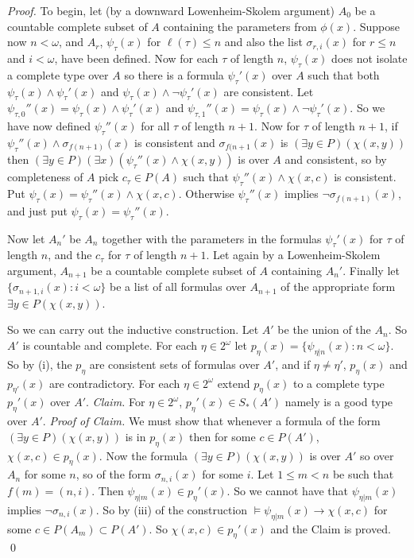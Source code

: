 \documentclass[12pt]{article}
\begin{document}
\begin{proof}
\vspace{2mm}
\noindent
To begin, let (by a downward Lowenheim-Skolem argument) $A_{0}$ be a countable complete subset of $A$ containing the parameters from $\phi(x)$. 
Suppose now $n< \omega$,  and $A_{r}$, $\psi_{\tau}(x)$ for $\ell(\tau) \leq n$ and also the list $\sigma_{r,i}(x)$ for $r\leq n$ and $i<\omega$, have been defined. 
Now for each $\tau$ of length $n$, $\psi_{\tau}(x)$ does not isolate a complete type over $A$ so there is a formula $\psi_{\tau}'(x)$ over $A$ such that both $\psi_{\tau}(x)\wedge \psi_{\tau}'(x)$ and $\psi_{\tau}(x)\wedge \neg\psi_{\tau}'(x)$ are consistent.   Let $\psi_{\tau ,0}''(x)  = \psi_{\tau}(x)\wedge \psi_{\tau}'(x)$ and $\psi_{\tau, 1}''(x) = \psi_{\tau}(x)\wedge \neg\psi_{\tau}'(x)$. 
So we have now defined $\psi_{\tau}''(x)$ for all $\tau$ of length $n+1$.  Now for $\tau$ of length $n+1$, if $\psi_{\tau}''(x)\wedge \sigma_{f(n+1)}(x)$ is consistent and $\sigma_{f(n+1}(x)$ is $(\exists y\in P)(\chi(x,y))$ then 
$(\exists y\in P)(\exists x)(\psi_{\tau}''(x) \wedge \chi(x,y))$ is over $A$ and consistent, so by completeness of $A$ pick $c_{\tau} \in P(A)$ such that $\psi_{\tau}''(x)\wedge \chi(x,c)$ is consistent.  Put $\psi_{\tau}(x) = \psi_{\tau}''(x)\wedge \chi(x,c)$.  Otherwise $\psi_{\tau}''(x)$ implies $\neg\sigma_{f(n+1)}(x)$, and just put $\psi_{\tau}(x) = \psi_{\tau}''(x)$. 

Now let $A_{n}'$ be $A_{n}$ together with the parameters in the formulas $\psi_{\tau}'(x)$ for $\tau$ of length $n$, and the $c_{\tau}$ for $\tau$ of length $n+1$. Let again by a  Lowenheim-Skolem argument, $A_{n+1}$ be a countable complete subset of $A$ containing $A_{n}'$.  Finally let  $\{\sigma_{n+1, i}(x): i<\omega\}$ be a list of all formulas over $A_{n+1}$ of the appropriate form $\exists y\in P(\chi(x,y))$.

\vspace{2mm}
\noindent
So we can carry out the inductive construction. Let $A'$ be the union of the $A_{n}$. So $A'$ is countable and complete. For each  $\eta\in 2^{\omega}$ let $p_{\eta}(x) = \{\psi_{\eta|n}(x): n <\omega\}$. So by (i), the $p_{\eta}$ are consistent sets of formulas over $A'$, and if $\eta \neq \eta'$, $p_{\eta}(x)$ and $p_{\eta'}(x)$ are contradictory.
 For each $\eta\in 2^{\omega}$ extend $p_{\eta}(x)$ to a complete type $p_{\eta}'(x)$ over $A'$.
\newline
{\em Claim.}  For $\eta\in 2^{\omega}$, $p_{\eta}'(x) \in S_{*}(A')$ namely is a good type over $A'$. 
\newline
{\em Proof of Claim.}  We must show that whenever a formula of the form $(\exists y\in P)(\chi(x,y))$ is in $p_{\eta}(x)$ then for some $c\in P(A')$, $\chi(x,c)\in p_{\eta}(x)$.  Now the formula $(\exists y\in P)(\chi(x,y))$ is over $A'$ so 
over $A_{n}$ for some $n$, so of the form $\sigma_{n,i}(x)$ for some $i$. Let $1\leq m < n$ be such that $f(m) = (n,i)$. Then $\psi_{\eta|m}(x) \in p_{\eta}'(x)$. So we cannot have that $\psi_{\eta|m}(x)$ implies $\neg\sigma_{n,i}(x)$.  So by (iii) 
of the construction $\models \psi_{\eta|m}(x) \to \chi(x,c)$ for some $c\in P(A_{m})\subset P(A')$. So $\chi(x,c) \in p_{\eta}'(x)$ and the Claim is proved.  \qed


\end{proof}
\end{document}
